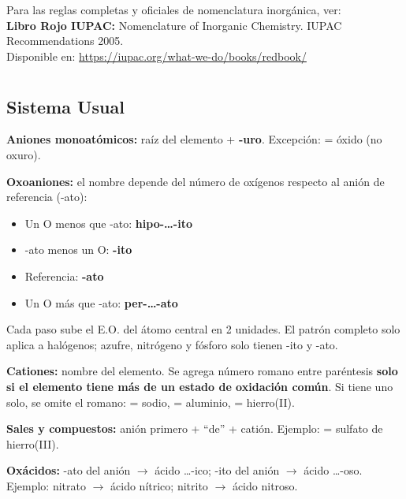 Para las reglas completas y oficiales de nomenclatura inorgánica, ver:\\
\textbf{Libro Rojo IUPAC:} Nomenclature of Inorganic Chemistry. IUPAC Recommendations 2005.\\
Disponible en: \url{https://iupac.org/what-we-do/books/redbook/}

\newpage

{}
\section*{\centering\fontsize{12}{18}}

\subsection*{\textcolor{blueunam}{Sistema Usual}}

\textbf{Aniones monoatómicos:} raíz del elemento + \textbf{-uro}. Excepción:  = óxido (no oxuro).

\textbf{Oxoaniones:} el nombre depende del número de oxígenos respecto al anión de referencia (-ato):
\begin{itemize}
  \item Un O menos que -ato: \textbf{hipo-\ldots-ito}
  \item -ato menos un O: \textbf{-ito}
  \item Referencia: \textbf{-ato}
  \item Un O más que -ato: \textbf{per-\ldots-ato}
\end{itemize}
Cada paso sube el E.O. del átomo central en 2 unidades. El patrón completo solo aplica a halógenos; azufre, nitrógeno y fósforo solo tienen -ito y -ato.

\textbf{Cationes:} nombre del elemento. Se agrega número romano entre paréntesis \textbf{solo si el elemento tiene más de un estado de oxidación común}. Si tiene uno solo, se omite el romano:  = sodio,  = aluminio,  = hierro(II).

\textbf{Sales y compuestos:} anión primero + ``de'' + catión. Ejemplo:  = sulfato de hierro(III).

\textbf{Oxácidos:} -ato del anión $\to$ ácido \ldots-ico; \quad -ito del anión $\to$ ácido \ldots-oso.\\
Ejemplo: nitrato $\to$ ácido nítrico; nitrito $\to$ ácido nitroso.

